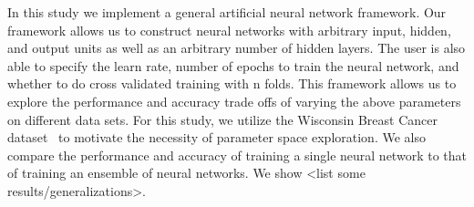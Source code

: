 In this study we implement a general artificial neural network framework.
Our framework allows us to construct neural networks with arbitrary input, hidden, and output units as well as an arbitrary number of hidden layers.
The user is also able to specify the learn rate, number of epochs to train the neural network, and whether to do cross validated training with n folds.
This framework allows us to explore the performance and accuracy trade offs of varying the above parameters on different data sets.
For this study, we utilize the Wisconsin Breast Cancer dataset~\cite{wolberg1990multisurface} to motivate the necessity of parameter space exploration.
We also compare the performance and accuracy of training a single neural network to that of training an ensemble of neural networks.
We show <list some results/generalizations>.
